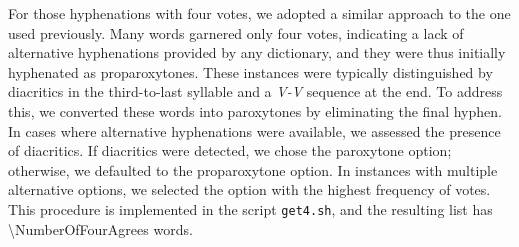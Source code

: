 For those hyphenations with four votes, we adopted a similar approach to the
one used previously. Many words garnered only four votes, indicating a lack of
alternative hyphenations provided by any dictionary, and they were thus initially
hyphenated as proparoxytones. These instances were typically distinguished by
diacritics in the third-to-last syllable and a \emph{V-V} sequence at the end.
To address this, we converted these words into paroxytones by eliminating the
final hyphen. In cases where alternative hyphenations were available, we
assessed the presence of diacritics. If diacritics were detected, we chose the
paroxytone option; otherwise, we defaulted to the proparoxytone option. In
instances with multiple alternative options, we selected the option with the
highest frequency of votes. This procedure is implemented in the script
\texttt{get4.sh}, and the resulting list has \num{\NumberOfFourAgrees} words.






